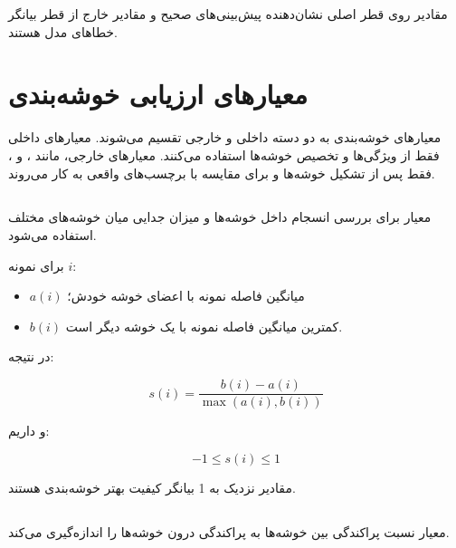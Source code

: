 مقادیر روی قطر اصلی نشان‌دهنده پیش‌بینی‌های صحیح و مقادیر خارج از قطر بیانگر خطاهای مدل هستند.


\section{معیارهای ارزیابی خوشه‌بندی}

معیارهای خوشه‌بندی به دو دسته داخلی و خارجی تقسیم می‌شوند. معیارهای داخلی فقط از ویژگی‌ها و تخصیص خوشه‌ها استفاده می‌کنند. معیارهای خارجی، مانند
،
و
،
فقط پس از تشکیل خوشه‌ها و برای مقایسه با برچسب‌های واقعی به کار می‌روند.


\subsection{}

معیار
برای بررسی انسجام داخل خوشه‌ها و میزان جدایی میان خوشه‌های مختلف استفاده می‌شود.

برای نمونه $i$:

\begin{itemize}
	\item $a(i)$ میانگین فاصله نمونه با اعضای خوشه خودش؛
	\item $b(i)$ کمترین میانگین فاصله نمونه با یک خوشه دیگر است.
\end{itemize}

در نتیجه:

\begin{equation}
s(i)
=
\frac{
b(i)-a(i)
}{
\max(a(i),b(i))
}
\end{equation}

و داریم:

\begin{equation}
-1
\leq
s(i)
\leq
1
\end{equation}

مقادیر نزدیک به 1 بیانگر کیفیت بهتر خوشه‌بندی هستند.

\subsection{}

معیار
نسبت پراکندگی بین خوشه‌ها به پراکندگی درون خوشه‌ها را اندازه‌گیری می‌کند.

